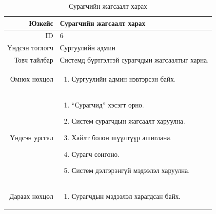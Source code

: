 \begin{longtable}{|r|p{11cm}|}
\caption{Сурагчийн жагсаалт харах}
\label{table:usecase6}\\ \hline
Юзкейс & Сурагчийн жагсаалт харах \\ \hline
ID & 6 \\ \hline
Үндсэн тоглогч & Сургуулийн админ \\ \hline
Товч тайлбар & Системд бүртгэлтэй
сурагчдын жагсаалтыг харна. \\ \hline
Өмнөх нөхцөл &
\begin{enumerate}[nosep]
\item Сургуулийн админ нэвтэрсэн байх.
\end{enumerate} \\ \hline
Үндсэн урсгал &
\begin{enumerate}[nosep]
\item ``Сурагчид'' хэсэгт орно.
\item Систем сурагчдын жагсаалт харуулна.
\item Хайлт болон шүүлтүүр ашиглана.
\item Сурагч сонгоно.
\item Систем дэлгэрэнгүй мэдээлэл харуулна.
\end{enumerate} \\ \hline
Дараах нөхцөл &
\begin{enumerate}[nosep]
\item Сурагчдын мэдээлэл харагдсан байх.
\end{enumerate} \\ \hline
\end{longtable}

